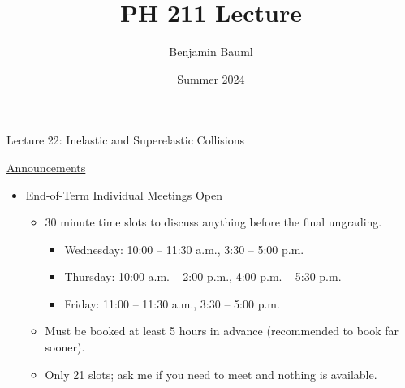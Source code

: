 \documentclass[]{article}
\title{PH 211 Lecture \Week}
\author{Benjamin Bauml}
\date{Summer 2024}
\newcommand{\Week}{22}
\begin{document}
\begin{TeacherMargin}

\end{TeacherMargin}
\begin{PresentSpace}
\begin{center}
	\huge Lecture \Week: Inelastic and Superelastic Collisions
\end{center}
\vspace{0.5cm}
\underline{Announcements}
\begin{itemize}
	\item End-of-Term Individual Meetings Open
	\begin{itemize}
		\item 30 minute time slots to discuss anything before the final ungrading.
		\begin{itemize}
			\item Wednesday: 10:00 -- 11:30 a.m., 3:30 -- 5:00 p.m.
			\item Thursday: 10:00 a.m. -- 2:00 p.m., 4:00 p.m. -- 5:30 p.m.
			\item Friday: 11:00 -- 11:30 a.m., 3:30 -- 5:00 p.m.
		\end{itemize}
		\item Must be booked at least 5 hours in advance (recommended to book far sooner).
		\item Only 21 slots; ask me if you need to meet and nothing is available.
	\end{itemize}
\end{itemize}
\end{PresentSpace}
\newpage
\end{document}
